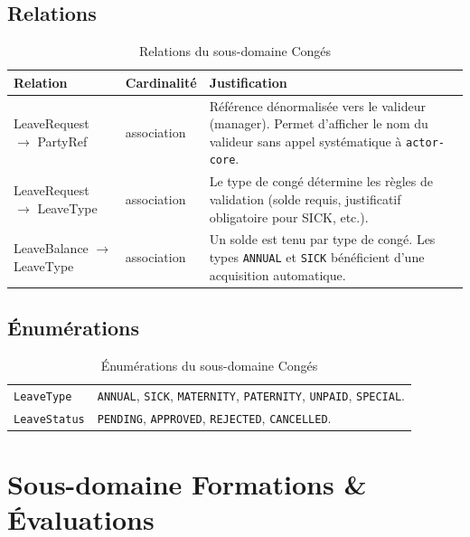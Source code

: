 \documentclass[a4paper,12pt,openany]{book}
\begin{document}
    \subsection{Relations}

    \begin{table}[H]
        \centering
        \caption{Relations du sous-domaine Congés}
        \begin{tabularx}{\textwidth}{llX}
    \toprule
    \textbf{Relation} & \textbf{Cardinalité} & \textbf{Justification} \\
    \midrule
    LeaveRequest $\longrightarrow$ PartyRef & association & Référence dénormalisée vers le valideur (manager). Permet d'afficher le nom du valideur sans appel systématique à \texttt{actor-core}. \\
    LeaveRequest $\longrightarrow$ LeaveType & association & Le type de congé détermine les règles de validation (solde requis, justificatif obligatoire pour SICK, etc.). \\
    LeaveBalance $\longrightarrow$ LeaveType & association & Un solde est tenu par type de congé. Les types \texttt{ANNUAL} et \texttt{SICK} bénéficient d'une acquisition automatique. \\
    \bottomrule
        \end{tabularx}
    \end{table}

    \subsection{Énumérations}

    \begin{table}[H]
        \centering
        \caption{Énumérations du sous-domaine Congés}
        \begin{tabularx}{\textwidth}{lX}
    \toprule
    \texttt{LeaveType}   & \texttt{ANNUAL}, \texttt{SICK}, \texttt{MATERNITY}, \texttt{PATERNITY}, \texttt{UNPAID}, \texttt{SPECIAL}. \\
    \texttt{LeaveStatus} & \texttt{PENDING}, \texttt{APPROVED}, \texttt{REJECTED}, \texttt{CANCELLED}. \\
    \bottomrule
        \end{tabularx}
    \end{table}


    \section{Sous-domaine Formations \& Évaluations}
\end{document}
